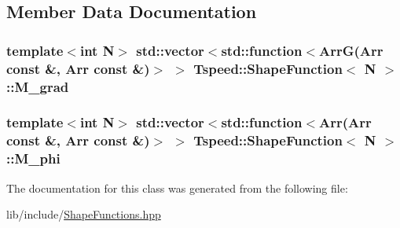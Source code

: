 \subsection{Member Data Documentation}
\hypertarget{classTspeed_1_1ShapeFunction_a282cf4ac589829f07a6c24e443d7bd05}{
\subsubsection[{M\-\_\-grad}]{\setlength{\rightskip}{0pt plus 5cm}template$<$int N$>$ std\-::vector$<${\bf std\-::function}$<$Arr\-G(Arr const \&, Arr const \&)$>$ $>$ {\bf Tspeed\-::\-Shape\-Function}$<$ N $>$\-::M\-\_\-grad\hspace{0.3cm}{\ttfamily [protected]}}}\label{classTspeed_1_1ShapeFunction_a282cf4ac589829f07a6c24e443d7bd05}
\hypertarget{classTspeed_1_1ShapeFunction_a6d8010d0c9d5e40f21f57c8201149ad5}{
\subsubsection[{M\-\_\-phi}]{\setlength{\rightskip}{0pt plus 5cm}template$<$int N$>$ std\-::vector$<${\bf std\-::function}$<$Arr(Arr const \&, Arr const \&)$>$ $>$ {\bf Tspeed\-::\-Shape\-Function}$<$ N $>$\-::M\-\_\-phi\hspace{0.3cm}{\ttfamily [protected]}}}\label{classTspeed_1_1ShapeFunction_a6d8010d0c9d5e40f21f57c8201149ad5}


The documentation for this class was generated from the following file\-:\begin{DoxyCompactItemize}
\item 
lib/include/\hyperlink{ShapeFunctions_8hpp}{Shape\-Functions.\-hpp}\end{DoxyCompactItemize}
